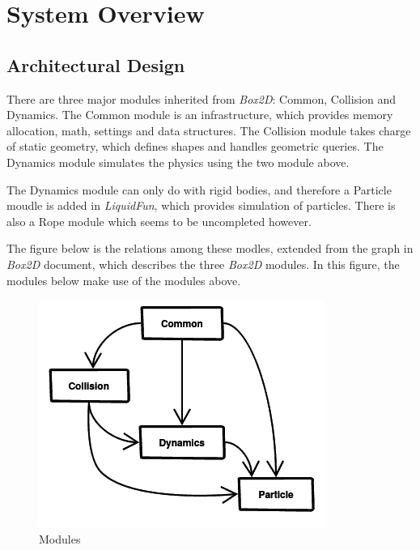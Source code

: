 \documentclass[UTF8]{ctexart}
\begin{document}
    \section{System Overview}

        \subsection{Architectural Design}
            
            There are three major modules inherited from \textit{Box2D}: Common, Collision and Dynamics. The Common module is an infrastructure, which provides memory allocation, math, settings and data structures. The Collision module takes charge of static geometry, which defines shapes and handles geometric queries. The Dynamics module simulates the physics using the two module above.

            The Dynamics module can only do with rigid bodies, and therefore a Particle moudle is added in \textit{LiquidFun}, which provides simulation of particles. There is also a Rope module which seems to be uncompleted however.

            The figure below is the relations among these modles, extended from the graph in \textit{Box2D} document, which describes the three \textit{Box2D} modules. In this figure, the modules below make use of the modules above.

            \begin{figure}[ht]
                \centering
                \includegraphics[width=.5\textwidth]{modules.png}
                \caption{Modules}
            \end{figure}
\end{document}
